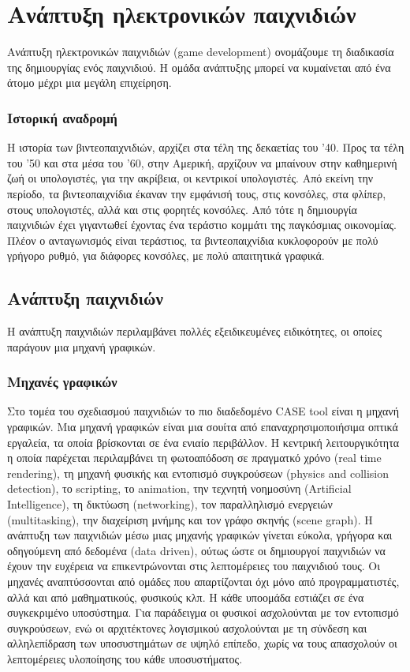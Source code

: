 \chapter{Aνάπτυξη ηλεκτρονικών παιχνιδιών}
Aνάπτυξη ηλεκτρονικών παιχνιδιών (game development) ονομάζουμε τη διαδικασία της δημιουργίας ενός παιχνιδιού. Η ομάδα ανάπτυξης μπορεί να κυμαίνεται από ένα άτομο μέχρι μια μεγάλη επιχείρηση.	
	\subsection{Ιστορική αναδρομή}
	Η ιστορία των βιντεοπαιχνιδιών, αρχίζει στα τέλη της δεκαετίας του '40. Προς τα τέλη του '50 και στα μέσα του '60, στην Αμερική, αρχίζουν να μπαίνουν στην καθημερινή ζωή οι υπολογιστές, για την ακρίβεια, οι κεντρικοί υπολογιστές. Από εκείνη την περίοδο, τα βιντεοπαιχνίδια έκαναν την εμφάνισή τους, στις κονσόλες, στα φλίπερ, στους υπολογιστές, αλλά και στις φορητές κονσόλες. Από τότε η δημιουργία παιχνιδιών έχει γιγαντωθεί έχοντας ένα τεράστιο κομμάτι της παγκόσμιας οικονομίας.
	Πλέον ο ανταγωνισμός είναι τεράστιος, τα βιντεοπαιχνίδια κυκλοφορούν με πολύ γρήγορο ρυθμό, για διάφορες κονσόλες, με πολύ απαιτητικά γραφικά.
			
	\section{Ανάπτυξη παιχνιδιών}
	Η ανάπτυξη παιχνιδιών περιλαμβάνει πολλές εξειδικευμένες ειδικότητες, οι οποίες παράγουν μια μηχανή γραφικών.
	
	\subsection{Μηχανές γραφικών}	
	Στο τομέα του σχεδιασμού παιχνιδιών το πιο διαδεδομένο CASE tool είναι η μηχανή γραφικών. Μια μηχανή γραφικών είναι μια σουίτα από επαναχρησιμοποιήσιμα οπτικά εργαλεία, τα οποία βρίσκονται σε ένα ενιαίο περιβάλλον.
	Η κεντρική λειτουργικότητα η οποία παρέχεται περιλαμβάνει τη φωτοαπόδοση σε πραγματκό χρόνο (real time rendering), τη μηχανή φυσικής και εντοπισμό συγκρούσεων (physics and collision detection), το scripting, το animation, την τεχνητή νοημοσύνη (Artificial Intelligence), τη δικτύωση (networking), τον παραλληλισμό ενεργειών (multitasking), την διαχείριση μνήμης και τον γράφο σκηνής (scene graph). Η ανάπτυξη των παιχνιδιών μέσω μιας μηχανής γραφικών γίνεται εύκολα, γρήγορα και οδηγούμενη από δεδομένα (data driven), ούτως ώστε οι δημιουργοί παιχνιδιών να έχουν την ευχέρεια να επικεντρώνονται στις λεπτομέρειες του παιχνιδιού τους.
	Οι μηχανές αναπτύσσονται από ομάδες που απαρτίζονται όχι μόνο από προγραμματιστές, αλλά και από μαθηματικούς, φυσικούς κλπ. Η κάθε υποομάδα εστιάζει σε ένα συγκεκριμένο υποσύστημα. Για παράδειγμα οι φυσικοί ασχολούνται με τον εντοπισμό συγκρούσεων, ενώ οι αρχιτέκτονες λογισμικού ασχολούνται με τη σύνδεση και αλληλεπίδραση των υποσυστημάτων σε υψηλό επίπεδο, χωρίς να τους απασχολούν οι λεπτομέρειες υλοποίησης του κάθε υποσυστήματος.
	
